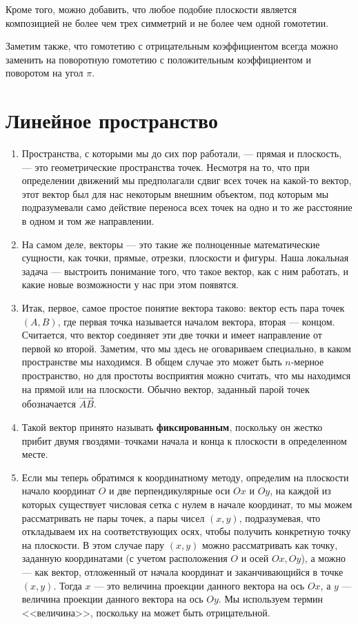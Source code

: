 Кроме того, можно добавить, что любое подобие плоскости является композицией не более чем трех симметрий и не более чем одной гомотетии.

Заметим также, что гомотетию с отрицательным коэффициентом всегда можно заменить на поворотную гомотетию с положительным коэффициентом и поворотом на угол $\pi$.

\section{Линейное пространство}


\begin{enumerate}

\item Пространства, с которыми мы до сих пор работали, --- прямая и плоскость, --- это геометрические пространства точек. Несмотря на то, что при определении движений мы предполагали сдвиг всех точек на какой-то вектор, этот вектор был для нас некоторым внешним объектом, под которым мы подразумевали само действие переноса всех точек на одно и то же расстояние в одном и том же направлении.
\item На самом деле, векторы --- это такие же полноценные математические сущности, как точки, прямые, отрезки, плоскости и фигуры. Наша локальная задача --- выстроить понимание того, что такое вектор, как с ним работать, и какие новые возможности у нас при этом появятся.
\item Итак, первое, самое простое понятие вектора таково: вектор есть пара точек $(A,B)$, где первая точка называется началом вектора, вторая --- концом. Считается, что вектор соединяет эти две точки и имеет направление от первой ко второй. Заметим, что мы здесь не оговариваем специально, в каком пространстве мы находимся. В общем случае это может быть $n$-мерное пространство, но для простоты восприятия можно считать, что мы находимся на прямой или на плоскости. Обычно вектор, заданный парой точек обозначается $\vec{AB}$.
\item Такой вектор принято называть \textbf{фиксированным}, поскольку он жестко прибит двумя гвоздями--точками начала и конца к плоскости в определенном месте.
\item Если мы теперь обратимся к координатному методу, определим на плоскости начало координат $O$ и две перпендикулярные оси $Ox$ и $Oy$, на каждой из которых существует числовая сетка с нулем в начале координат, то мы можем рассматривать не пары точек, а пары чисел $(x,y)$, подразумевая, что откладываем их на соответствующих осях, чтобы получить конкретную точку на плоскости. В этом случае пару $(x,y)$ можно рассматривать как точку, заданную координатами (с учетом расположения $O$ и осей $Ox,Oy$), а можно --- как вектор, отложенный от начала координат и заканчивающийся в точке $(x,y)$. Тогда $x$ --- это величина проекции данного вектора на ось $Ox$, а $y$ --- величина проекции данного вектора на ось $Oy$. Мы используем термин <<величина>>, поскольку на может быть отрицательной.

\end{enumerate}
